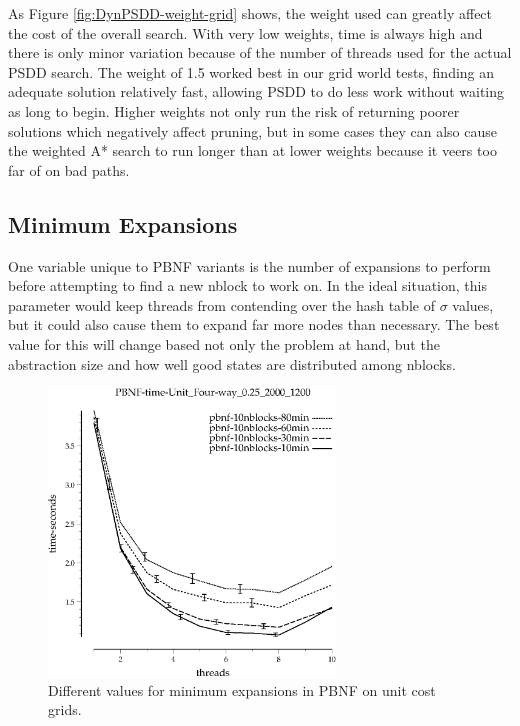 \documentclass{article}
\begin{document}
As Figure \ref{fig:DynPSDD-weight-grid} shows, the weight used can greatly affect the cost of the overall search. With very low weights, time is always high and there is only minor variation because of the number of threads used for the actual PSDD search. The weight of 1.5 worked best in our grid world tests, finding an adequate solution relatively fast, allowing PSDD to do less work without waiting as long to begin. Higher weights not only run the risk of returning poorer solutions which negatively affect pruning, but in some cases they can also cause the weighted A* search to run longer than at lower weights because it veers too far of on bad paths.
\subsection{Minimum Expansions}
One variable unique to PBNF variants is the number of expansions to perform before attempting to find a new nblock to work on. In the ideal situation, this parameter would keep threads from contending over the hash table of $\sigma$ values, but it could also cause them to expand far more nodes than necessary. The best value for this will change based not only the problem at hand, but the abstraction size and how well good states are distributed among nblocks.

\begin{figure}[h!]
\includegraphics[width=3in]{../graphs/grid_unit_four-way_0.25_2000_1200/PBNF-time-Unit_Four-way_0.25_2000_1200.eps}
\caption{Different values for minimum expansions in PBNF on unit cost grids.}
\label{fig:PBNF-min-grid}
\end{figure}
\end{document}
